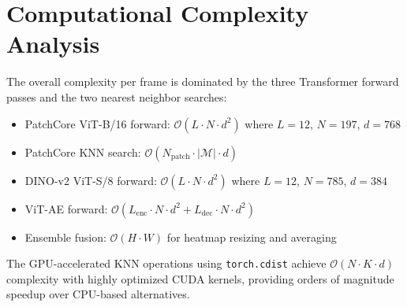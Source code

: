 \documentclass[journal]{IEEEtran}
\begin{document}
\section{Computational Complexity Analysis}
\label{apx:complexity}

The overall complexity per frame is dominated by the three Transformer forward passes and the two nearest neighbor searches:

\begin{itemize}[nosep]
    \item PatchCore ViT-B/16 forward: $\mathcal{O}(L \cdot N \cdot d^2)$ where $L=12$, $N=197$, $d=768$
    \item PatchCore KNN search: $\mathcal{O}(N_{\text{patch}} \cdot |\mathcal{M}| \cdot d)$
    \item DINO-v2 ViT-S/8 forward: $\mathcal{O}(L \cdot N \cdot d^2)$ where $L=12$, $N=785$, $d=384$
    \item ViT-AE forward: $\mathcal{O}(L_{\text{enc}} \cdot N \cdot d^2 + L_{\text{dec}} \cdot N \cdot d^2)$
    \item Ensemble fusion: $\mathcal{O}(H \cdot W)$ for heatmap resizing and averaging
\end{itemize}

The GPU-accelerated KNN operations using \texttt{torch.cdist} achieve $\mathcal{O}(N \cdot K \cdot d)$ complexity with highly optimized CUDA kernels, providing orders of magnitude speedup over CPU-based alternatives.
\end{document}

